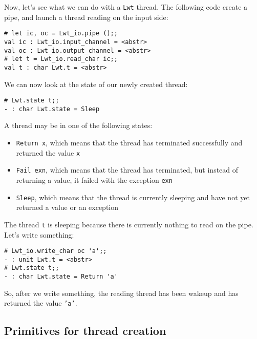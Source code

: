 Now, let's see what we can do with a {\tt Lwt} thread. The following
code create a pipe, and launch a thread reading on the input side:



\lstset{language=[Objective]Caml}\begin{lstlisting}
# let ic, oc = Lwt_io.pipe ();;
val ic : Lwt_io.input_channel = <abstr>
val oc : Lwt_io.output_channel = <abstr>
# let t = Lwt_io.read_char ic;;
val t : char Lwt.t = <abstr>

\end{lstlisting}
We can now look at the state of our newly created thread:



\lstset{language=[Objective]Caml}\begin{lstlisting}
# Lwt.state t;;
- : char Lwt.state = Sleep

\end{lstlisting}
A thread may be in one of the following states:



\begin{itemize}
\item  {\tt Return x}, which means that the thread has terminated
successfully and returned the value {\tt x}
\item  {\tt Fail exn}, which means that the thread has terminated,
but instead of returning a value, it failed with the exception
{\tt exn}
\item  {\tt Sleep}, which means that the thread is currently
sleeping and have not yet returned a value or an exception

\end{itemize}

The thread {\tt t} is sleeping because there is currently nothing
to read on the pipe. Let's write something:



\lstset{language=[Objective]Caml}\begin{lstlisting}
# Lwt_io.write_char oc 'a';;
- : unit Lwt.t = <abstr>
# Lwt.state t;;
- : char Lwt.state = Return 'a'

\end{lstlisting}
So, after we write something, the reading thread has been wakeup and
has returned the value {\tt 'a'}.



\subsection{ Primitives for thread creation }

